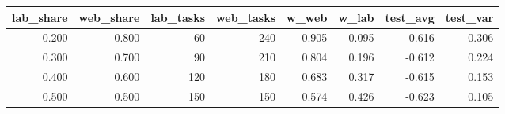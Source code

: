 \begin{tabular}{rrrrrrrr}
\toprule
lab_share & web_share & lab_tasks & web_tasks & w_web & w_lab & test_avg & test_var \\
\midrule
0.200 & 0.800 & 60 & 240 & 0.905 & 0.095 & -0.616 & 0.306 \\
0.300 & 0.700 & 90 & 210 & 0.804 & 0.196 & -0.612 & 0.224 \\
0.400 & 0.600 & 120 & 180 & 0.683 & 0.317 & -0.615 & 0.153 \\
0.500 & 0.500 & 150 & 150 & 0.574 & 0.426 & -0.623 & 0.105 \\
\bottomrule
\end{tabular}

